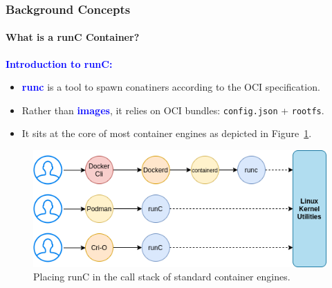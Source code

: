 \documentclass[9pt,    %
    english,            %
    xcolor=table,       %
    envcountsect,        %
    aspectratio=169     %
]{beamer}
\begin{document}
\begin{frame}
    \frametitle{Background Concepts}
    \framesubtitle{What is a runC Container?}

    \textbf{\textcolor{blue}{Introduction to runC:}}
    \begin{itemize}
        \item \textbf{\textcolor{blue}{runc}} is a tool to spawn conatiners according to the OCI specification.
        \item Rather than \textbf{\textcolor{blue}{images}}, it relies on OCI bundles: \texttt{config.json} + \texttt{rootfs}.
        \item It sits at the core of most container engines as depicted in Figure~\ref{fig:runc}.
    \end{itemize}

    \begin{figure}[h!]
        \includegraphics[width=.5\textwidth]{./images/runc.png}
        \caption{Placing runC in the call stack of standard container engines.\label{fig:runc}}
    \end{figure}
\end{frame}
\end{document}
